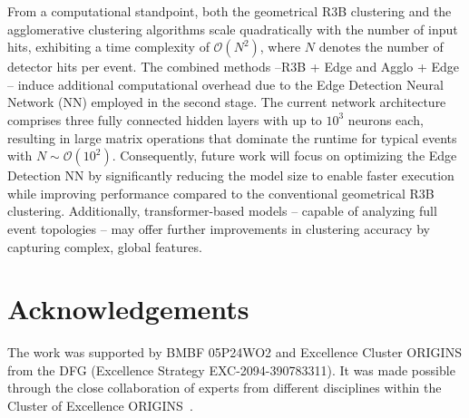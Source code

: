 \documentclass[final,5p,times,twocolumn]{elsarticle}
\begin{document}
From a computational standpoint, both the geometrical R3B clustering and the agglomerative clustering algorithms scale quadratically with the number of input hits, exhibiting a time complexity of \(\mathcal{O}(N^2)\), where \(N\) denotes the number of detector hits per event. The combined methods --R3B + Edge and Agglo + Edge -- induce additional computational overhead due to the Edge Detection Neural Network (NN) employed in the second stage. The current network architecture comprises three fully connected hidden layers with up to \(10^3\) neurons each, resulting in large matrix operations that dominate the runtime for typical events with \(N \sim \mathcal{O}(10^2)\). Consequently, future work will focus on optimizing the Edge Detection NN by significantly reducing the model size to enable faster execution while improving performance compared to the conventional geometrical R3B clustering.\newline
Additionally, transformer-based models \cite{vaswani2017attention} -- capable of analyzing full event topologies -- may offer further improvements in clustering accuracy by capturing complex, global features.

\section*{Acknowledgements}
The work was supported by BMBF 05P24WO2 and Excellence Cluster ORIGINS from the DFG (Excellence Strategy EXC-2094-390783311). It was made possible through the close collaboration of experts from different disciplines within the Cluster of Excellence ORIGINS~\cite{origins2025}.




 







\end{document}
